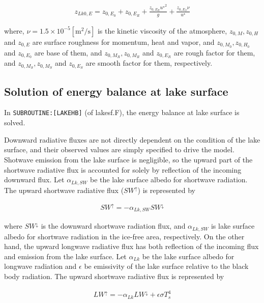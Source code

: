 \begin{eqnarray}
    z_{Lk0,E} = z_{0,E_0} + z_{0,E_R} + \frac{z_{0,E_R} {u^\star }^2 }{g} + \frac{z_{0,E_S}\nu }{u^\star}
\end{eqnarray}

where, \(\nu = 1.5 \times 10^{-5} \mathrm{[m^2/s]}\) is the kinetic
viscosity of the atmosphere, \(z_{0,M},z_{0,H}\) and \(z_{0,E}\) are
surface roughness for momentum, heat and vapor, and
\(z_{0,M_0},z_{0,H_0}\) and \(z_{0,E_0}\) are base of them, and
\(z_{0,M_R},z_{0,M_R}\) and \(z_{0,E_R}\) are rough factor for them, and
\(z_{0,M_S},z_{0,M_S}\) and \(z_{0,E_S}\) are smooth factor for them,
respectively.

\hypertarget{solution-of-energy-balance-at-lake-surface}{%
\subsection{Solution of energy balance at lake
surface}\label{solution-of-energy-balance-at-lake-surface}}

In \texttt{SUBROUTINE:{[}LAKEHB{]}} (of lakesf.F), the energy balance at
lake surface is solved.

Downward radiative fluxes are not directly dependent on the condition of
the lake surface, and their observed values are simply specified to
drive the model. Shotwave emission from the lake surface is negligible,
so the upward part of the shortwave radiative flux is accounted for
solely by reflection of the incoming downward flux. Let
\(\alpha_{Lk,SW}\) be the lake surface albedo for shortwave radiation.
The upward shortwave radiative flux (\(SW^\uparrow\)) is represented by

\begin{eqnarray}
    SW^\uparrow = - \alpha_{Lk,SW} SW^\downarrow
\end{eqnarray}

where \(SW^\downarrow\) is the downward shortwave radiation flux, and
\(\alpha_{Lk,SW}\) is lake surface albedo for shortwave radiation in the
ice-free area, respectively. On the other hand, the upward longwave
radiative flux has both reflection of the incoming flux and emission
from the lake surface. Let \(\alpha_{Lk}\) be the lake surface albedo
for longwave radiation and \(\epsilon\) be emissivity of the lake
surface relative to the black body radiation. The upward shortwave
radiative flux is represented by

\begin{eqnarray}
    LW^\uparrow = - \alpha_{Lk} LW^\downarrow + \epsilon \sigma T_s ^4
\end{eqnarray}

